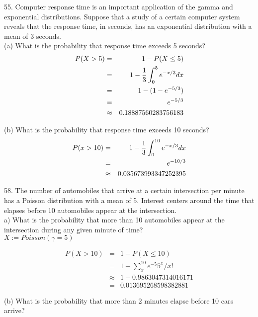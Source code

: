 55. Computer response time is an important application of the gamma and exponential distributions. Suppose that a study of a certain computer system reveals that the response time, in seconds, has an exponential distribution with a mean of 3 seconds. \\

(a) What is the probability that response time exceeds 5 seconds? \\

\begin{eqnarray*}
P(X > 5) & = & 1 - P(X \leq 5) \\
  & = & 1 - \frac{1}{3} \int^5_0 e^{-x/3} dx \\
  & = & 1 - (1 - e^{-5/3}) \\
  & = & e^{-5/3} \\
  & \approx & 0.18887560283756183 
\end{eqnarray*}

(b) What is the probability that response time exceeds 10 seconds? \\

\begin{eqnarray*}
P(x > 10) & = & 1 - \frac{1}{3} \int^{10}_0 e^{-x/3} dx \\
  & = & e^{-10/3} \\
  & \approx & 0.035673993347252395
\end{eqnarray*}

58. The number of automobiles that arrive at a certain intersection per minute has a Poisson distribution with a mean of 5. Interest centers around the time that elapses before 10 automobiles appear at the intersection. \\

a) What is the probability that more than 10 automobiles appear at the intersection during any given minute of time? \\

$X := Poisson(\gamma = 5)$

\begin{eqnarray*}
P(X > 10) & = &  1 - P(X \leq 10) \\
& = & 1 - \sum_x^{10} e^{-5}5^x/x! \\
& \approx & 1 -  0.9863047314016171 \\
& = & 0.013695268598382881
\end{eqnarray*}

(b) What is the probability that more than 2 minutes
elapse before 10 cars arrive? \\

